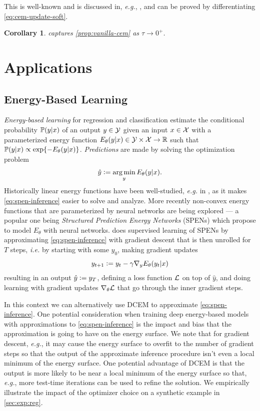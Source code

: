 \documentclass{article}
\newtheorem{corollary}{Corollary}
\newcommand{\eg}{{\it e.g.}\xspace}
\newcommand{\ie}{{\it i.e.}\xspace}
\begin{document}
This is well-known and is discussed in, \eg, \citet{de2005tutorial},
and can be proved by differentiating \cref{eq:cem-update-soft}.

\begin{corollary}
 captures
\cref{prop:vanilla-cem} as $\tau\rightarrow 0^+$.
\end{corollary}

\section{Applications}
\subsection{Energy-Based Learning}
\label{sec:app:eb}

\emph{Energy-based learning} for regression and classification
estimate the conditional probability ${\mathbb{P}}(y|x)$ of an output $y\in{\mathcal{Y}}$
given an input $x\in{\mathcal{X}}$ with a parameterized energy function
\mbox{$E_\theta(y|x)\in{\mathcal{Y}}\times{\mathcal{X}} \rightarrow {\mathbb{R}}$}
such that ${\mathbb{P}}(y|x) \propto \exp\{-E_\theta(y|x)\}$.
\emph{Predictions} are made by solving the optimization problem
\begin{equation}
  \hat y \vcentcolon= \operatorname*{arg\,min}_y E_\theta(y|x).
  \label{eq:spen-inference}
\end{equation}
Historically linear energy functions have been well-studied,
\eg in \citet{taskar2005learning,lecun2006tutorial},
as it makes \cref{eq:spen-inference} easier to solve
and analyze.
More recently non-convex energy functions that are parameterized
by neural networks are being explored --- a popular one being
\emph{Structured Prediction Energy Networks} (SPENs)
\citep{belanger2016structured} which propose to model
$E_\theta$ with neural networks.
\citet{belanger2017end} does supervised learning of
SPENs by approximating \cref{eq:spen-inference}
with gradient descent that is then unrolled for $T$ steps,
\ie by starting with some $y_0$, making
gradient updates
$$y_{t+1}\vcentcolon= y_t-\gamma \nabla_y E_\theta(y_t|x)$$
resulting in an output $\hat y \vcentcolon= y_T$,
defining a loss function $\mathcal{L}$ on top of $\hat y$,
and doing learning with gradient updates $\nabla_\theta \mathcal{L}$
that go through the inner gradient steps.

In this context we can alternatively use DCEM to approximate
\cref{eq:spen-inference}.
One potential consideration when training deep energy-based
models with approximations to \cref{eq:spen-inference} is
the impact and bias that the approximation is going to have
on the energy surface.
We note that for gradient descent, \eg, it may cause the energy
surface to overfit to the number of gradient steps so that
the output of the approximate inference procedure isn't even
a local minimum of the energy surface.
One potential advantage of DCEM is that the output is more likely
to be near a local minimum of the energy surface so that,
\eg, more test-time iterations can be used to refine the solution.
We empirically illustrate the impact of the optimizer choice
on a synthetic example in \cref{sec:exp:reg}.
\end{document}

